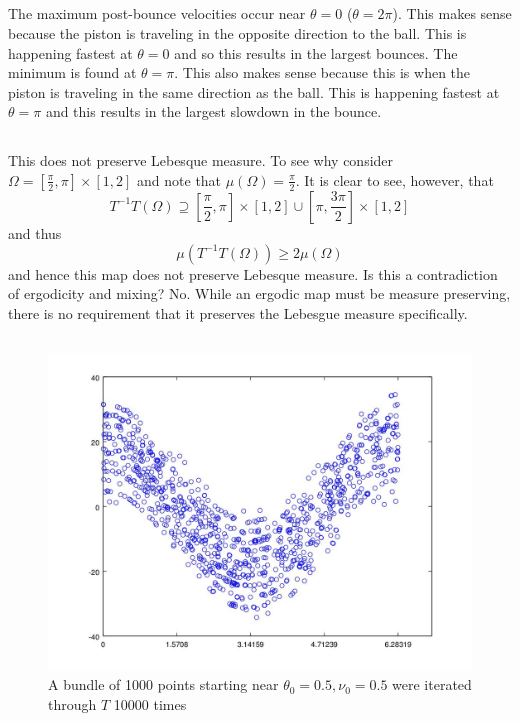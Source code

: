 \documentclass{unswmaths}
\begin{document}
\subsection{}
The maximum post-bounce velocities occur near $ \theta = 0 $ ($\theta = 2\pi$). This makes sense because the piston is traveling in the opposite direction to the ball. This is happening fastest at $ \theta = 0 $ and so this results in the largest bounces. The minimum is found at $ \theta = \pi $. This also makes sense because this is when the piston is traveling in the same direction as the ball. This is happening fastest at $ \theta = \pi $ and this results in the largest slowdown in the bounce.

\subsection{}
This does not preserve Lebesque measure. To see why consider $ \Omega = [\frac{\pi}{2}, \pi] \times [1,2] $ and note that $ \mu(\Omega) = \frac{\pi}{2} $. It is clear to see, however, that $$ T^{-1}T(\Omega) \supseteq [\frac{\pi}{2},\pi] \times [1,2] \cup [\pi, \frac{3\pi}{2}] \times [1,2]$$ and thus $$ \mu(T^{-1}T(\Omega)) \geq 2 \mu(\Omega) $$ and hence this map does not preserve Lebesque measure.
Is this a contradiction of ergodicity and mixing? No. While an ergodic map must be measure preserving, there is no requirement that it preserves the Lebesgue measure specifically. 
\subsection{}
\label{qn_6_ergodic}
\begin{figure}[h]
    \includegraphics[scale=0.5]{Question_6_Ergodic}
    \caption{A bundle of 1000 points starting near $ \theta_0 = 0.5,  \nu_0 = 0.5 $ were iterated through $  T $ 10000 times}
\end{figure}
\end{document}
